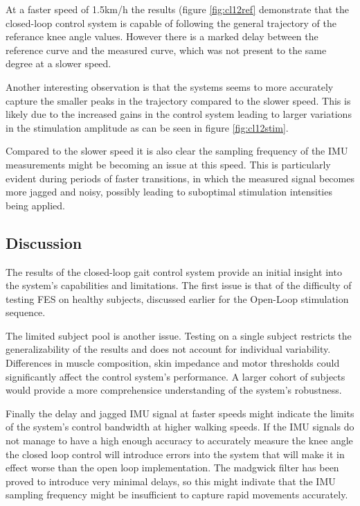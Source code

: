 
At a faster speed of 1.5km/h the results (figure \ref{fig:cl12ref} demonstrate that the closed-loop control system is capable of following the general trajectory of the referance knee angle values. However there is a marked delay between the reference curve and the measured curve, which was not present to the same degree at a slower speed.

Another interesting observation is that the systems seems to more accurately capture the smaller peaks in the trajectory compared to the slower speed. This is likely due to the increased gains in the control system leading to larger variations in the stimulation amplitude as can be seen in figure \ref{fig:cl12stim}.

Compared to the slower speed it is also clear the sampling frequency of the IMU measurements might be becoming an issue at this speed. This is particularly evident during periods of faster transitions, in which the measured signal becomes more jagged and noisy, possibly leading to suboptimal stimulation intensities being applied. 

\subsection{Discussion}
The results of the closed-loop gait control system provide an initial insight into the system's capabilities and limitations. The first issue is that of the difficulty of testing FES on healthy subjects, discussed earlier for the Open-Loop stimulation sequence.

The limited subject pool is another issue. Testing on a single subject restricts the generalizability of the results and does not account for individual variability. Differences in muscle composition, skin impedance and motor thresholds could significantly affect the control system's performance. A larger cohort of subjects would provide a more comprehensice understanding of the system's robustness.

Finally the delay and jagged IMU signal at faster speeds might indicate the limits of the system's control bandwidth at higher walking speeds. If the IMU signals do not manage to have a high enough accuracy to accurately measure the knee angle the closed loop control will introduce errors into the system that will make it in effect worse than the open loop implementation. The madgwick filter has been proved to introduce very minimal delays, so this might indivate that the IMU sampling frequency might be insufficient to capture rapid movements accurately. 

